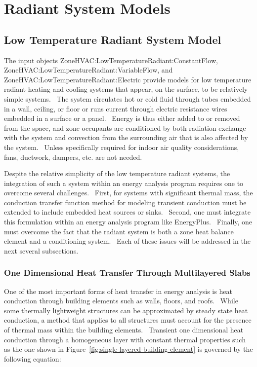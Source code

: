 \section{Radiant System Models }\label{radiant-system-models}

\subsection{Low Temperature Radiant System Model}\label{low-temperature-radiant-system-model}

The input objects ZoneHVAC:LowTemperatureRadiant:ConstantFlow, \\ ZoneHVAC:LowTemperatureRadiant:VariableFlow, and \\
ZoneHVAC:LowTemperatureRadiant:Electric provide models for low temperature radiant heating and cooling systems that appear, on the surface, to be relatively simple systems.~ The system circulates hot or cold fluid through tubes embedded in a wall, ceiling, or floor or runs current through electric resistance wires embedded in a surface or a panel.~ Energy is thus either added to or removed from the space, and zone occupants are conditioned by both radiation exchange with the system and convection from the surrounding air that is also affected by the system.~ Unless specifically required for indoor air quality considerations, fans, ductwork, dampers, etc. are not needed.

Despite the relative simplicity of the low temperature radiant systems, the integration of such a system within an energy analysis program requires one to overcome several challenges.~ First, for systems with significant thermal mass, the conduction transfer function method for modeling transient conduction must be extended to include embedded heat sources or sinks.~ Second, one must integrate this formulation within an energy analysis program like EnergyPlus.~ Finally, one must overcome the fact that the radiant system is both a zone heat balance element and a conditioning system.~ Each of these issues will be addressed in the next several subsections.

\subsubsection{One Dimensional Heat Transfer Through Multilayered Slabs}\label{one-dimensional-heat-transfer-through-multilayered-slabs}

One of the most important forms of heat transfer in energy analysis is heat conduction through building elements such as walls, floors, and roofs.~ While some thermally lightweight structures can be approximated by steady state heat conduction, a method that applies to all structures must account for the presence of thermal mass within the building elements.~ Transient one dimensional heat conduction through a homogeneous layer with constant thermal properties such as the one shown in Figure~\ref{fig:single-layered-building-element} is governed by the following equation:

